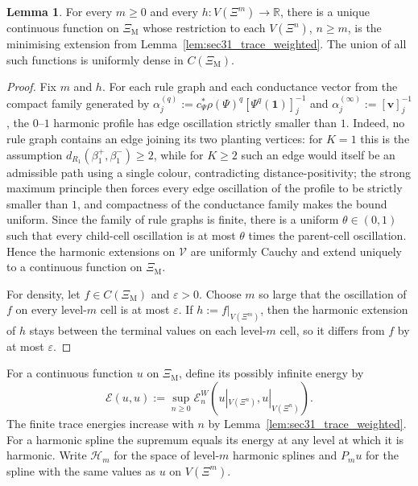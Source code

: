 \documentclass{article}
\theoremstyle{plain}
\theoremstyle{definition}
\newtheorem{lemma}[theorem]{Lemma}
\begin{document}
\begin{lemma}\label{lem:sec31_continuous_harmonics}
For every $m\ge 0$ and every $h:V(\Xi^m)\to\mathbb R$, there is a unique continuous function on $\Xi_{\mathrm M}$ whose restriction to each $V(\Xi^n)$, $n\ge m$, is the minimising extension from Lemma~\ref{lem:sec31_trace_weighted}.
The union of all such functions is uniformly dense in $C(\Xi_{\mathrm M})$.
\end{lemma}

\begin{proof}
Fix $m$ and $h$.
For each rule graph and each conductance vector from the compact family generated by $\alpha_j^{(q)}:=c_\Psi^*\rho(\Psi)^q[\Psi^q(\mathbf 1)]_j^{-1}$ and $\alpha_j^{(\infty)}:=[\mathbf v]_j^{-1}$, the $0$--$1$ harmonic profile has edge oscillation strictly smaller than $1$.
Indeed, no rule graph contains an edge joining its two planting vertices: for $K=1$ this is the assumption $d_{R_1}(\beta_1^+,\beta_1^-)\ge 2$, while for $K\ge 2$ such an edge would itself be an admissible path using a single colour, contradicting distance-positivity; the strong maximum principle then forces every edge oscillation of the profile to be strictly smaller than $1$, and compactness of the conductance family makes the bound uniform.
Since the family of rule graphs is finite, there is a uniform $\theta\in(0,1)$ such that every child-cell oscillation is at most $\theta$ times the parent-cell oscillation.
Hence the harmonic extensions on $\mathscr V$ are uniformly Cauchy and extend uniquely to a continuous function on $\Xi_{\mathrm M}$.

For density, let $f\in C(\Xi_{\mathrm M})$ and $\varepsilon>0$.
Choose $m$ so large that the oscillation of $f$ on every level-$m$ cell is at most $\varepsilon$.
If $h:=f|_{V(\Xi^m)}$, then the harmonic extension of $h$ stays between the terminal values on each level-$m$ cell, so it differs from $f$ by at most $\varepsilon$.
\end{proof}

\begingroup\color{red}
For a continuous function $u$ on $\Xi_{\mathrm M}$, define its possibly infinite energy by
\[
\mathcal E(u,u):=\sup_{n\ge0}
\mathcal E_n^W(u|_{V(\Xi^n)},u|_{V(\Xi^n)}).
\]
The finite trace energies increase with $n$ by Lemma~\ref{lem:sec31_trace_weighted}.
For a harmonic spline the supremum equals its energy at any level at which
it is harmonic. Write $\mathcal H_m$ for the space of level-$m$ harmonic
splines and $P_m u$ for the spline with the same values as $u$ on $V(\Xi^m)$.
\endgroup{}
\end{document}
